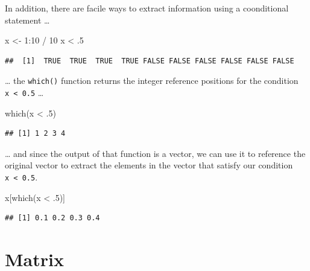 \documentclass[
]{book}
\newenvironment{Shaded}{\begin{snugshade}}{\end{snugshade}}
\newcommand{\DecValTok}[1]{\textcolor[rgb]{0.00,0.00,0.81}{#1}}
\newcommand{\FunctionTok}[1]{\textcolor[rgb]{0.00,0.00,0.00}{#1}}
\newcommand{\NormalTok}[1]{#1}
\newcommand{\OtherTok}[1]{\textcolor[rgb]{0.56,0.35,0.01}{#1}}
\newcommand{\SpecialCharTok}[1]{\textcolor[rgb]{0.00,0.00,0.00}{#1}}
\begin{document}
In addition, there are facile ways to extract information using a coonditional statement \ldots{}

\begin{Shaded}
\begin{Highlighting}[]
\NormalTok{x }\OtherTok{\textless{}{-}} \DecValTok{1}\SpecialCharTok{:}\DecValTok{10} \SpecialCharTok{/} \DecValTok{10}
\NormalTok{x }\SpecialCharTok{\textless{}}\NormalTok{ .}\DecValTok{5}
\end{Highlighting}
\end{Shaded}

\begin{verbatim}
##  [1]  TRUE  TRUE  TRUE  TRUE FALSE FALSE FALSE FALSE FALSE FALSE
\end{verbatim}

\ldots{} the \texttt{which()} function returns the integer reference positions for the condition \texttt{x\ \textless{}\ 0.5} \ldots{}

\begin{Shaded}
\begin{Highlighting}[]
\FunctionTok{which}\NormalTok{(x }\SpecialCharTok{\textless{}}\NormalTok{ .}\DecValTok{5}\NormalTok{)}
\end{Highlighting}
\end{Shaded}

\begin{verbatim}
## [1] 1 2 3 4
\end{verbatim}

\ldots{} and since the output of that function is a vector, we can use it to reference the original vector to extract the elements in the vector that satisfy our condition \texttt{x\ \textless{}\ 0.5}.

\begin{Shaded}
\begin{Highlighting}[]
\NormalTok{x[}\FunctionTok{which}\NormalTok{(x }\SpecialCharTok{\textless{}}\NormalTok{ .}\DecValTok{5}\NormalTok{)]}
\end{Highlighting}
\end{Shaded}

\begin{verbatim}
## [1] 0.1 0.2 0.3 0.4
\end{verbatim}

\hypertarget{matrix}{%
\section{Matrix}\label{matrix}}
\end{document}
